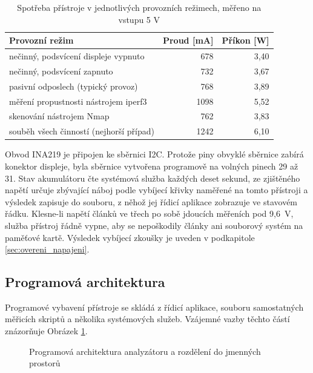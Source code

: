 \begin{table}[htbp]
    \caption{Spotřeba přístroje v jednotlivých provozních režimech, měřeno na vstupu 5 V}
    \label{tab:spotreba}
    \centering
    \begin{tabular}{lrr}
        \hline
        Provozní režim & Proud [mA] & Příkon [W] \\
        \hline
        nečinný, podsvícení displeje vypnuto & 678 & 3,40 \\
        nečinný, podsvícení zapnuto & 732 & 3,67 \\
        pasivní odposlech (typický provoz) & 768 & 3,89 \\
        měření propustnosti nástrojem iperf3 & 1098 & 5,52 \\
        skenování nástrojem Nmap & 762 & 3,83 \\
        souběh všech činností (nejhorší případ) & 1242 & 6,10 \\
        \hline
    \end{tabular}
\end{table}

Obvod INA219 je připojen ke sběrnici I2C. Protože piny obvyklé sběrnice zabírá konektor displeje, byla sběrnice vytvořena programově na volných pinech 29 až 31. Stav akumulátoru čte systémová služba každých deset sekund, ze zjištěného napětí určuje zbývající náboj podle vybíjecí křivky naměřené na tomto přístroji a výsledek zapisuje do souboru, z něhož jej řídicí aplikace zobrazuje ve stavovém řádku. Klesne-li napětí článků ve třech po sobě jdoucích měřeních pod 9,6~V, služba přístroj řádně vypne, aby se nepoškodily články ani souborový systém na paměťové kartě. Výsledek vybíjecí zkoušky je uveden v podkapitole \ref{sec:overeni_napajeni}.

\subsection{Programová architektura}
\label{sec:architektura}

Programové vybavení přístroje se skládá z řídicí aplikace, souboru samostatných měřicích skriptů a několika systémových služeb. Vzájemné vazby těchto částí znázorňuje Obrázek \ref{fig:architektura}.

\begin{figure}[htbp]
    \centering
    
    \caption{Programová architektura analyzátoru a rozdělení do jmenných prostorů}
    \label{fig:architektura}
\end{figure}

